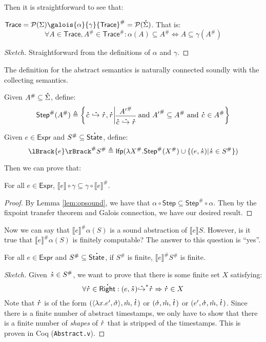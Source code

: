 \documentclass[acmsmall,screen,review]{acmart}\settopmatter{printfolios=true,printccs=false,printacmref=false}
\newcommand*{\pset}{\mathcal{P}}
\newcommand*{\A}[1]{\overset{\,_{\mbox{\Large .}}}{#1}}
\newcommand*{\Abs}[1]{{#1}^{\#}}
\newcommand*{\Expr}{\mathsf{Expr}}
\newcommand*{\ctx}{\sigma}
\newcommand*{\mem}{m}
\newcommand*{\Trace}{\mathsf{Trace}}
\newcommand*{\config}{c}
\newcommand*{\Right}{\mathsf{Right}}
\newcommand*{\rightst}{r}
\newcommand*{\State}{\mathsf{State}}
\newcommand*{\lfp}{\mathsf{lfp}}
\newcommand*{\Step}{\mathsf{Step}}
\newcommand*{\semarrow}{\hookrightarrow}
\newcommand*{\sembracket}[1]{\lBrack{#1}\rBrack}
\begin{document}
Then it is straightforward to see that:
\begin{lemma}
  $\Trace=\pset(\Sigma)\galois{\alpha}{\gamma}\Abs{\Trace}=\pset(\A\Sigma)$. That is:
  \[\forall A\in \Trace,\Abs{A}\in\Abs{\Trace}:\alpha(A)\subseteq\Abs{A}\Leftrightarrow A\subseteq\gamma(\Abs{A})\]
\end{lemma}
\begin{proof}[Sketch]
  Straightforward from the definitions of $\alpha$ and $\gamma$.
\end{proof}

The definition for the abstract semantics is naturally connected soundly with the collecting semantics.
\begin{definition}
  Given $\Abs{A}\subseteq\A{\Sigma}$, define:
  \[
    \Abs{\mathsf{Step}}(\Abs{A})\triangleq
    \left\{\A\config\A\semarrow\A\rightst, \A\rightst\middle|
    \begin{prooftree}[center=true]
      \hypo{\Abs{A'}}\infer1{\A\config\A\semarrow\A\rightst}
    \end{prooftree}\text{ and }
    \Abs{A'}\subseteq \Abs{A}\text{ and }\A\config\in\Abs{A}
    \right\}
  \]
\end{definition}
\begin{definition}
  Given $e\in\Expr$ and $\Abs{S}\subseteq\A\State$, define:
  \[
    \Abs{\sembracket{e}}\Abs{S}\triangleq\lfp(\lambda \Abs{X}.\Abs{\mathsf{Step}}(\Abs{X})\cup\{(e,\A{s})|\A{s}\in \Abs{S}\})
  \]
\end{definition}
Then we can prove that:
\begin{theorem}[Soundness]
  For all $e\in\Expr$, $\sembracket{e}\circ\gamma\subseteq\gamma\circ\Abs{\sembracket{e}}$.
\end{theorem}
\begin{proof}
  By Lemma \ref{lem:opsound}, we have that $\alpha\circ\Step\subseteq\Abs\Step\circ\alpha$.
  Then by the fixpoint transfer theorem and Galois connection, we have our desired result.
\end{proof}

Now we can say that $\Abs{\sembracket{e}}\alpha(S)$ is a sound abstraction of $\sembracket{e}S$.
However, is it true that $\Abs{\sembracket{e}}\alpha(S)$ is finitely computable?
The answer to this question is ``yes''.

\begin{theorem}[Finiteness]
  For all $e\in\Expr$ and $\Abs{S}\subseteq\A\State$, if $\Abs{S}$ is finite, $\Abs{\sembracket{e}}\Abs{S}$ is finite.
\end{theorem}
\begin{proof}[Sketch]
  Given $\A{s}\in\Abs{S}$, we want to prove that there is some finite set $X$ satisfying:
  \[\forall \A\rightst\in\A\Right:(e,\A{s}){\A\semarrow}^*\A\rightst\Rightarrow\A\rightst\in X\]
  Note that $\A\rightst$ is of the form $(\langle\lambda x.e',\A{\ctx}\rangle,\A\mem,\A{t})$ or $(\A{\ctx},\A\mem,\A{t})$ or $(e',\A{\ctx},\A\mem,\A{t})$.
  Since there is a finite number of abstract timestamps, we only have to show that there is a finite number of \emph{shapes} of $\A\rightst$ that is stripped of the timestamps.
  This is proven in Coq (\texttt{Abstract.v}).
\end{proof}
\end{document}
